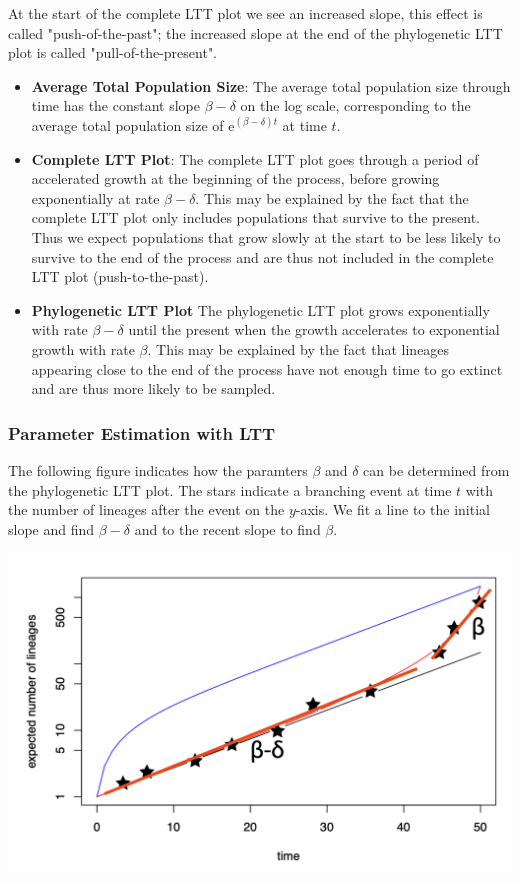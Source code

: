 \documentclass{article}
\begin{document}
\begin{multicols*}{3}
At the start of the complete LTT plot we see an increased slope, this effect is called "push-of-the-past"; the increased slope at the end of the phylogenetic LTT plot is called "pull-of-the-present". 

\begin{itemize}
    \item \textbf{Average Total Population Size}: The average total population size through time has the constant slope $\beta - \delta$ on the log scale, corresponding to the average total population size of $\text{e}^{(\beta - \delta)t}$ at time $t$.
    \item \textbf{Complete LTT Plot}: The complete LTT plot goes through a period of accelerated growth at the beginning of the process, before growing exponentially at rate $\beta - \delta$. This may be explained by the fact that the complete LTT plot only includes populations that survive to the present. Thus we expect populations that grow slowly at the start to be less likely to survive to the end of the process and are thus not included in the complete LTT plot (push-to-the-past).
    \item \textbf{Phylogenetic LTT Plot} The phylogenetic LTT plot grows exponentially with rate $\beta - \delta$ until the present when the growth accelerates to exponential growth with rate $\beta$. This may be explained by the fact that lineages appearing close to the end of the process have not enough time to go extinct and are thus more likely to be sampled.
\end{itemize}
\subsubsection{Parameter Estimation with LTT}

The following figure indicates how the paramters $\beta$ and $\delta$ can be determined from the phylogenetic LTT plot. The stars indicate a branching event at time $t$ with the number of lineages after the event on the $y$-axis. We fit a line to the initial slope and find $\beta - \delta$ and to the recent slope to find $\beta$.\\

\begin{center}
    \includegraphics[width=1\linewidth, angle=0.0]{lttregression.png}
\end{center}


\end{multicols*}
\end{document}
